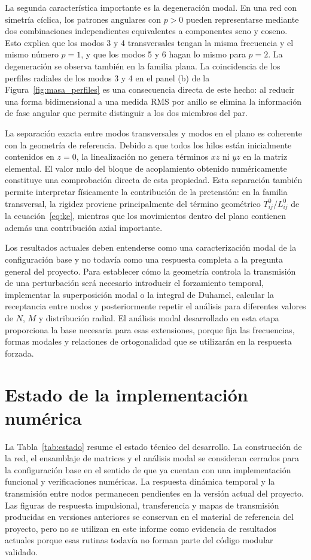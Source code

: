 \documentclass[11pt,letterpaper]{article}
\begin{document}
La segunda característica importante es la degeneración modal. En una red con simetría cíclica, los patrones angulares con $p>0$ pueden representarse mediante dos combinaciones independientes equivalentes a componentes seno y coseno. Esto explica que los modos 3 y 4 transversales tengan la misma frecuencia y el mismo número $p=1$, y que los modos 5 y 6 hagan lo mismo para $p=2$. La degeneración se observa también en la familia plana. La coincidencia de los perfiles radiales de los modos 3 y 4 en el panel (b) de la Figura~\ref{fig:masa_perfiles} es una consecuencia directa de este hecho: al reducir una forma bidimensional a una medida RMS por anillo se elimina la información de fase angular que permite distinguir a los dos miembros del par.

La separación exacta entre modos transversales y modos en el plano es coherente con la geometría de referencia. Debido a que todos los hilos están inicialmente contenidos en $z=0$, la linealización no genera términos $xz$ ni $yz$ en la matriz elemental. El valor nulo del bloque de acoplamiento obtenido numéricamente constituye una comprobación directa de esta propiedad. Esta separación también permite interpretar físicamente la contribución de la pretensión: en la familia transversal, la rigidez proviene principalmente del término geométrico $T_{ij}^{0}/L_{ij}^{0}$ de la ecuación~\eqref{eq:ke}, mientras que los movimientos dentro del plano contienen además una contribución axial importante.

Los resultados actuales deben entenderse como una caracterización modal de la configuración base y no todavía como una respuesta completa a la pregunta general del proyecto. Para establecer cómo la geometría controla la transmisión de una perturbación será necesario introducir el forzamiento temporal, implementar la superposición modal o la integral de Duhamel, calcular la receptancia entre nodos y posteriormente repetir el análisis para diferentes valores de $N$, $M$ y distribución radial. El análisis modal desarrollado en esta etapa proporciona la base necesaria para esas extensiones, porque fija las frecuencias, formas modales y relaciones de ortogonalidad que se utilizarán en la respuesta forzada.

\section{Estado de la implementación numérica}

La Tabla~\ref{tab:estado} resume el estado técnico del desarrollo. La construcción de la red, el ensamblaje de matrices y el análisis modal se consideran cerrados para la configuración base en el sentido de que ya cuentan con una implementación funcional y verificaciones numéricas. La respuesta dinámica temporal y la transmisión entre nodos permanecen pendientes en la versión actual del proyecto. Las figuras de respuesta impulsional, transferencia y mapas de transmisión producidas en versiones anteriores se conservan en el material de referencia del proyecto, pero no se utilizan en este informe como evidencia de resultados actuales porque esas rutinas todavía no forman parte del código modular validado.
\end{document}
